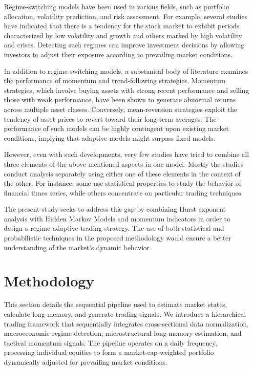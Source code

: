 \documentclass[12pt]{article}
\begin{document}
Regime‑switching models have been used in various fields, such as portfolio allocation, volatility prediction, and risk assessment. For example, several studies have indicated that there is a tendency for the stock market to exhibit periods characterized by low volatility and growth and others marked by high volatility and crises. Detecting such regimes can improve investment decisions by allowing investors to adjust their exposure according to prevailing market conditions.

In addition to regime‑switching models, a substantial body of literature examines the performance of momentum and trend‑following strategies. Momentum strategies, which involve buying assets with strong recent performance and selling those with weak performance, have been shown to generate abnormal returns across multiple asset classes. Conversely, mean‑reversion strategies exploit the tendency of asset prices to revert toward their long‑term averages. The performance of such models can be highly contingent upon existing market conditions, implying that adaptive models might surpass fixed models.

However, even with such developments, very few studies have tried to combine all three elements of the above-mentioned aspects in one model. Mostly the studies conduct analysis separately using either one of these elements in the context of the other. For instance, some use statistical properties to study the behavior of financial times series, while others concentrate on particular trading techniques.

The present study seeks to address this gap by combining Hurst exponent analysis with Hidden Markov Models and momentum indicators in order to design a regime‑adaptive trading strategy. The use of both statistical and probabilistic techniques in the proposed methodology would ensure a better understanding of the market’s dynamic behavior.

\section{Methodology}
This section details the sequential pipeline used to estimate market states, calculate long-memory, and generate trading signals. We introduce a hierarchical trading framework that sequentially integrates cross-sectional data normalization, macroeconomic regime detection, microstructural long-memory estimation, and tactical momentum signals. The pipeline operates on a daily frequency, processing individual equities to form a market-cap-weighted portfolio dynamically adjusted for prevailing market conditions.
\end{document}
